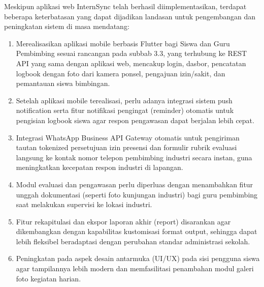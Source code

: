 Meskipun aplikasi web InternSync telah berhasil diimplementasikan, terdapat beberapa keterbatasan yang dapat dijadikan landasan untuk pengembangan dan peningkatan sistem di masa mendatang:

\begin{enumerate}[label=\arabic*.]
\item Merealisasikan aplikasi mobile berbasis Flutter bagi Siswa dan Guru Pembimbing sesuai rancangan pada subbab 3.3, yang terhubung ke REST API yang sama dengan aplikasi web, mencakup login, dasbor, pencatatan logbook dengan foto dari kamera ponsel, pengajuan izin/sakit, dan pemantauan siswa bimbingan.
\item Setelah aplikasi mobile terealisasi, perlu adanya integrasi sistem push notification serta fitur notifikasi pengingat (reminder) otomatis untuk pengisian logbook siswa agar respon pengawasan dapat berjalan lebih cepat.
\item Integrasi WhatsApp Business API Gateway otomatis untuk pengiriman tautan tokenized persetujuan izin presensi dan formulir rubrik evaluasi langsung ke kontak nomor telepon pembimbing industri secara instan, guna meningkatkan kecepatan respon industri di lapangan.
\item Modul evaluasi dan pengawasan perlu diperluas dengan menambahkan fitur unggah dokumentasi (seperti foto kunjungan industri) bagi guru pembimbing saat melakukan supervisi ke lokasi industri.
\item Fitur rekapitulasi dan ekspor laporan akhir (report) disarankan agar dikembangkan dengan kapabilitas kustomisasi format output, sehingga dapat lebih fleksibel beradaptasi dengan perubahan standar administrasi sekolah.
\item Peningkatan pada aspek desain antarmuka (UI/UX) pada sisi pengguna siswa agar tampilannya lebih modern dan memfasilitasi penambahan modul galeri foto kegiatan harian.
\end{enumerate}
